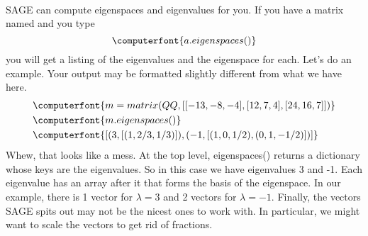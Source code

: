 \contributedby{\stevecanfield}\\
SAGE can compute eigenspaces and eigenvalues for you. If you have a matrix named  and you type
\begin{equation*}
\computerfont{a.eigenspaces()}
\end{equation*}
you will get a listing of the eigenvalues and the eigenspace for each. Let's do an example.  Your output may be formatted slightly different from what we have here.
%
\begin{align*}
&\computerfont{m = matrix( QQ, [[-13,-8,-4], [12,7,4], [24,16,7]])} \\
&\computerfont{m.eigenspaces()} \\
&\computerfont{[(3, [(1, 2/3, 1/3)]),(-1, [(1, 0, 1/2),(0, 1, -1/2)])]}\\
\end{align*}
%
Whew, that looks like a mess. At the top level, eigenspaces() returns a dictionary whose keys are the eigenvalues. So in this case we have eigenvalues 3 and -1. Each eigenvalue has an array after it that forms the basis of the eigenspace. In our example, there is 1 vector for $\lambda=3$ and 2 vectors for $\lambda=-1$. Finally, the vectors SAGE spits out may not be the nicest ones to work with. In particular, we might want to scale the vectors to get rid of fractions.